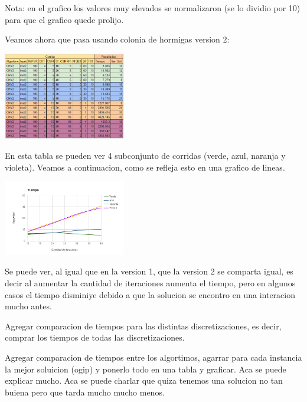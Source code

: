 Nota: en el grafico los valores muy elevados se normalizaron (se lo dividio por 10) para que el grafico quede prolijo.

Veamos ahora que pasa usando colonia de hormigas version 2:

\begin{center}
\includegraphics[width=0.4\textwidth]{imagenes/tabla4}
\end{center}

En esta tabla se pueden ver 4 subconjunto de corridas (verde, azul, naranja y violeta). Veamos a continuacion, como se refleja esto en una grafico de lineas.

\begin{center}
\includegraphics[width=0.4\textwidth]{imagenes/grafico2}
\end{center}

Se puede ver, al igual que en la version 1, que la version 2 se comparta igual, es decir al aumentar la cantidad de iteraciones aumenta el tiempo, pero en algunos casos el tiempo disminiye debido a que la solucion se encontro en una interacion mucho antes.




Agregar comparacion de tiempos para las distintas discretizaciones, es decir, comprar los tiempos de todas las discretizaciones. 



Agregar comparacion de tiempos entre los algortimos, agarrar para cada instancia la mejor soluicion (ogip) y ponerlo todo en una tabla y graficar. Aca se puede explicar mucho. 
Aca se puede charlar que quiza tenemos una solucion no tan buiena pero que tarda mucho mucho menos.

